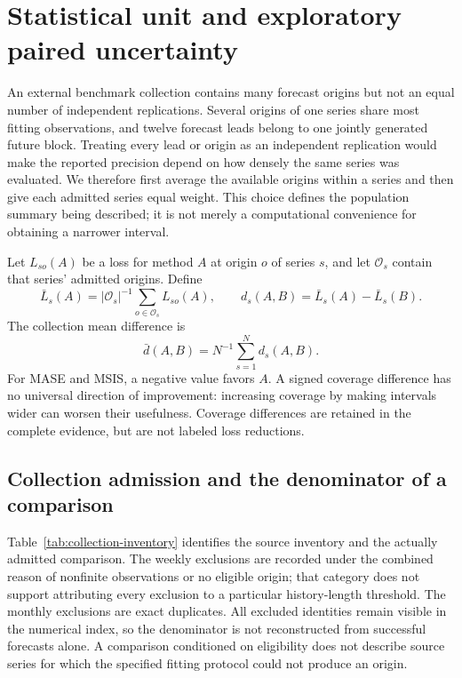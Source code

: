 \section{Statistical unit and exploratory paired uncertainty}
\label{sec:paired-uncertainty}

An external benchmark collection contains many forecast origins but not an
equal number of independent replications. Several origins of one series share
most fitting observations, and twelve forecast leads belong to one jointly
generated future block. Treating every lead or origin as an independent
replication would make the reported precision depend on how densely the same
series was evaluated. We therefore first average the available origins within
a series and then give each admitted series equal weight. This choice defines
the population summary being described; it is not merely a computational
convenience for obtaining a narrower interval.

Let $L_{so}(A)$ be a loss for method $A$ at origin $o$ of series $s$, and let
$\mathcal O_s$ contain that series' admitted origins. Define
\begin{equation}
 \bar L_s(A)=|\mathcal O_s|^{-1}\sum_{o\in\mathcal O_s}L_{so}(A),
 \qquad d_s(A,B)=\bar L_s(A)-\bar L_s(B).
 \label{eq:paired-series-loss}
\end{equation}
The collection mean difference is
\begin{equation}
 \bar d(A,B)=N^{-1}\sum_{s=1}^N d_s(A,B).
 \label{eq:paired-collection}
\end{equation}
For MASE and MSIS, a negative value favors $A$. A signed coverage difference
has no universal direction of improvement: increasing coverage by making
intervals wider can worsen their usefulness. Coverage differences are retained
in the complete evidence, but are not labeled loss reductions.

\subsection{Collection admission and the denominator of a comparison}
\label{sec:collection-admission}

Table~\ref{tab:collection-inventory} identifies the source inventory and the
actually admitted comparison. The weekly exclusions are recorded under the
combined reason of nonfinite observations or no eligible origin; that category
does not support attributing every exclusion to a particular history-length
threshold. The monthly exclusions are exact duplicates. All excluded identities
remain visible in the numerical index, so the denominator is not reconstructed
from successful forecasts alone. A comparison conditioned on eligibility does
not describe source series for which the specified fitting protocol could not
produce an origin.

